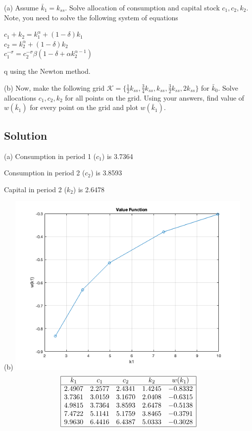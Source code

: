 \documentclass[10pt, a4paper]{article}
\begin{document}
    (a) Assume $\bar k_1=k_{ss}$. Solve allocation of consumption and capital stock $c_1, c_2, k_2$. Note, you need to solve the following system of equations 
    \begin{center}
      $c_1+k_2=k_1^{\alpha}+(1-\delta)k_1$ \\ 
      $c_2=k_2^{\alpha}+(1-\delta)k_2$ \\
      $c_1^{-\sigma}=c_2^{-\sigma}\beta(1-\delta+\alpha k_2^{\alpha-1})$ \\
    \end{center}
q   using the Newton method.

    (b) Now, make the following grid $\mathcal{K}=\{\frac{1}{2} k_{ss}, \frac{3}{4}k_{ss}, k_{ss}, \frac{3}{2}k_{ss}, 2k_{ss}\}$ for $\bar k_0$. Solve allocations $c_1, c_2, k_2$ for all points on the grid. Using your answers, find value of $w(\bar k_1)$ for every point on the grid and plot $w(\bar k_1)$.
  \subsection*{Solution}
    (a) Consumption in period 1 ($c_1$) is 3.7364

    Consumption in period 2 ($c_2$) is 3.8593

    Capital in period 2 ($k_2$) is 2.6478

    (b) \includegraphics*[width=0.9\textwidth]{1b.png}
  \begin{align*}
    \begin{array}{|ccccc|}
     \hline
      k_1 & c_1 & c_2 & k_2 & w(k_1) \\
      \hline
      2.4907 & 2.2577 & 2.4341 & 1.4245 & -0.8332 \\
      3.7361 & 3.0159 & 3.1670 & 2.0408 & -0.6315 \\
      4.9815 & 3.7364 & 3.8593 & 2.6478 & -0.5138 \\
      7.4722 & 5.1141 & 5.1759 & 3.8465 & -0.3791 \\
      9.9630 & 6.4416 & 6.4387 & 5.0333 & -0.3028 \\
      \hline
    \end{array}
  \end{align*}
\end{document}
